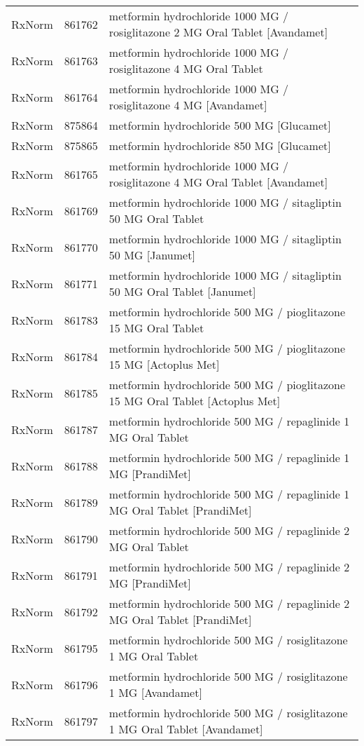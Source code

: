 \begin{longtable}{p{}p{}p{}}
  RxNorm & 861762 & metformin hydrochloride 1000 MG / rosiglitazone 2 MG Oral Tablet [Avandamet] \\ 
  RxNorm & 861763 & metformin hydrochloride 1000 MG / rosiglitazone 4 MG Oral Tablet \\ 
  RxNorm & 861764 & metformin hydrochloride 1000 MG / rosiglitazone 4 MG [Avandamet] \\ 
  RxNorm & 875864 & metformin hydrochloride 500 MG [Glucamet] \\ 
  RxNorm & 875865 & metformin hydrochloride 850 MG [Glucamet] \\ 
  RxNorm & 861765 & metformin hydrochloride 1000 MG / rosiglitazone 4 MG Oral Tablet [Avandamet] \\ 
  RxNorm & 861769 & metformin hydrochloride 1000 MG / sitagliptin 50 MG Oral Tablet \\ 
  RxNorm & 861770 & metformin hydrochloride 1000 MG / sitagliptin 50 MG [Janumet] \\ 
  RxNorm & 861771 & metformin hydrochloride 1000 MG / sitagliptin 50 MG Oral Tablet [Janumet] \\ 
  RxNorm & 861783 & metformin hydrochloride 500 MG / pioglitazone 15 MG Oral Tablet \\ 
  RxNorm & 861784 & metformin hydrochloride 500 MG / pioglitazone 15 MG [Actoplus Met] \\ 
  RxNorm & 861785 & metformin hydrochloride 500 MG / pioglitazone 15 MG Oral Tablet [Actoplus Met] \\ 
  RxNorm & 861787 & metformin hydrochloride 500 MG / repaglinide 1 MG Oral Tablet \\ 
  RxNorm & 861788 & metformin hydrochloride 500 MG / repaglinide 1 MG [PrandiMet] \\ 
  RxNorm & 861789 & metformin hydrochloride 500 MG / repaglinide 1 MG Oral Tablet [PrandiMet] \\ 
  RxNorm & 861790 & metformin hydrochloride 500 MG / repaglinide 2 MG Oral Tablet \\ 
  RxNorm & 861791 & metformin hydrochloride 500 MG / repaglinide 2 MG [PrandiMet] \\ 
  RxNorm & 861792 & metformin hydrochloride 500 MG / repaglinide 2 MG Oral Tablet [PrandiMet] \\ 
  RxNorm & 861795 & metformin hydrochloride 500 MG / rosiglitazone 1 MG Oral Tablet \\ 
  RxNorm & 861796 & metformin hydrochloride 500 MG / rosiglitazone 1 MG [Avandamet] \\ 
  RxNorm & 861797 & metformin hydrochloride 500 MG / rosiglitazone 1 MG Oral Tablet [Avandamet] \\ 

\end{longtable}
